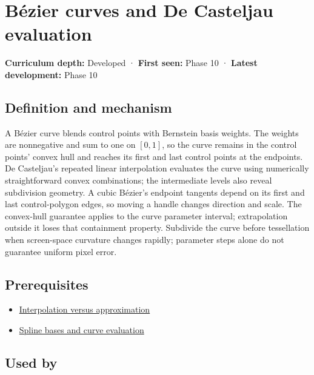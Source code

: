 \hypertarget{appendix-ddbec701898c}{}\label{referencestart:appendix-ddbec701898c}
\section{Bézier curves and De Casteljau evaluation}\label{appendix-ddbec701898c-buxe9zier-curves-and-de-casteljau-evaluation}

\textbf{Curriculum depth:} Developed · \textbf{First seen:} Phase 10 · \textbf{Latest development:} Phase 10

\subsection{Definition and mechanism}\label{appendix-ddbec701898c-definition-and-mechanism}

A Bézier curve blends control points with Bernstein basis weights. The weights are nonnegative and sum to one on \([0,1]\), so the curve remains in the control points' convex hull and reaches its first and last control points at the endpoints. De Casteljau's repeated linear interpolation evaluates the curve using numerically straightforward convex combinations; the intermediate levels also reveal subdivision geometry. A cubic Bézier's endpoint tangents depend on its first and last control-polygon edges, so moving a handle changes direction and scale. The convex-hull guarantee applies to the curve parameter interval; extrapolation outside it loses that containment property. Subdivide the curve before tessellation when screen-space curvature changes rapidly; parameter steps alone do not guarantee uniform pixel error.

\subsection{Prerequisites}\label{appendix-ddbec701898c-prerequisites}

\begin{itemize}
\tightlist
\item
  \hyperref[appendix-0c2a5f69851e]{Interpolation versus approximation}
\item
  \hyperref[appendix-f28eeec97a3d]{Spline bases and curve evaluation}
\end{itemize}

\subsection{Used by}\label{appendix-ddbec701898c-used-by}

